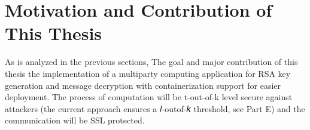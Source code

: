 \section{Motivation and Contribution of This Thesis}

As is analyzed in the previous sections, The goal and major contribution of this thesis the implementation of a multiparty computing application for RSA key generation and message decryption with containerization support for easier deployment. The process of computation will be t-out-of-k level secure against attackers (the current approach ensures a 𝑙-outof-𝑘 threshold, see Part E) and the communication will be SSL protected.
